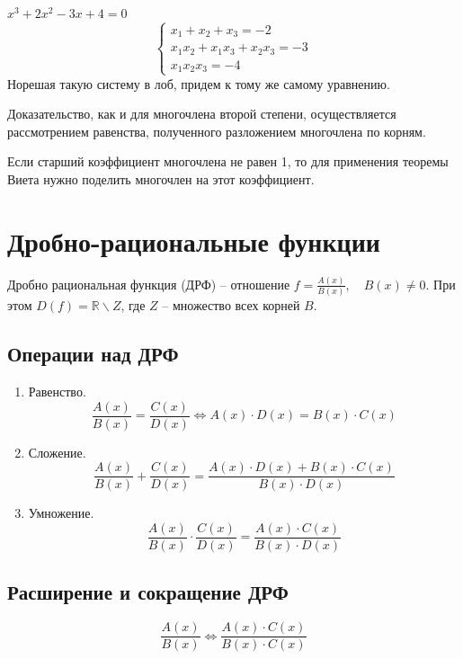 \documentclass[12pt, a4paper]{article}
\begin{document}
    \begin{exmp}
        \( x^3  + 2x^2 - 3x + 4 = 0 \)
        \[
            \begin{cases}
                x_{1} + x_{2} + x_{3} = -2 \\
                x_{1}x_{2} + x_{1}x_{3} + x_{2}x_{3} = -3 \\
                x_{1}x_{2}x_{3} = -4
            \end{cases}
        \] 
        Норешая такую систему в лоб, придем к тому же самому уравнению.
        
    \end{exmp}
    \begin{rem}
        Доказательство, как и для многочлена второй степени, осуществляется рассмотрением равенства, полученного разложением многочлена по корням.
    \end{rem}
    \begin{rem}
        Если старший коэффициент многочлена не равен 1, то для применения теоремы Виета нужно поделить многочлен на этот коэффициент.
    \end{rem}

    \section{Дробно-рациональные функции}
    \begin{definition}
        Дробно рациональная функция (ДРФ) -- отношение \( f = \frac{A(x)}{B(x)}, \quad B(x) \neq 0 \). При этом \( D(f) = \mathbb{R} \backslash Z \), где \( Z \) -- множество всех корней \( B \).
    \end{definition}
    \subsection{Операции над ДРФ}
    \begin{enumerate}
        \item  Равенство. \[
            \frac{A(x)}{B(x)} = \frac{C(x)}{D(x)} \iff A(x) \cdot D(x) = B(x) \cdot C(x)
        \] 
        \item Сложение. \[
                \frac{A(x)}{B(x)} + \frac{C(x)}{D(x)} = \frac{A(x)\cdot D(x) + B(x) \cdot C(x)}{B(x) \cdot D(x)}
        \] 
        \item Умножение. \[
            \frac{A(x)}{B(x)} \cdot \frac{C(x)}{D(x)} = \frac{A(x) \cdot  C(x)}{B(x) \cdot D(x)}
        \]  
    \end{enumerate}
    \subsection{Расширение и сокращение ДРФ}
    \[
        \frac{A(x)}{B(x)} \iff \frac{A(x) \cdot C(x)}{B(x) \cdot C(x)}
    \] 
\end{document}
